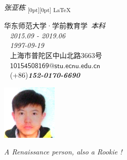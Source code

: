 \documentclass[a4paper, 12pt, oneside]{article}
\begin{document}
\newcommand\myworries[1]{\textcolor{red}{#1}}
\pagestyle{empty}
    \begin{tcolorbox}[colback=red!58!white,colframe=red!75!black]
        \Large \textit{张亚栋} \hfill\textsubscript{\raisebox{0pt}[0pt][0pt]{\large\faHeartO\raisebox{0.3ex}{\fontsize{12pt}{12pt}\faHeartO}%
    \raisebox{2.2ex}{\fontsize{11pt}{11pt}\faHeartO}%
    \raisebox{4.5ex}{\fontsize{10pt}{10pt}\faHeartO}
    \LaTeX
}}
    \end{tcolorbox}
    \begin{minipage}[t]{0.6\linewidth}
    \noindent
    \textcolor{red}{\faGraduationCap} 华东师范大学·学前教育学~\emph{本科}\\
    \textcolor{black}{\faCalendar}~ \emph{2015.09 - 2019.06}\\
    \textcolor{blue}{\faMars}~ \emph{1997-09-19}\\
    \textcolor{yellow}{\faMapMarker}~ 上海市普陀区中山北路3663号\\
    \textcolor{cyan}{\faEnvelope}~ $\mathsf{10154508169@stu.ecnu.edu.cn}$ \\ 
    \textcolor{black}{\fontsize{18pt}{18pt}\faMobile}~ (+86)\textbf{\emph{152-0170-6690}}
    \end{minipage}
    \begin{minipage}[t]{0.1\linewidth}
    \begin{center}
        \includegraphics{photo.png}
    \end{center}
    \end{minipage}
    \begin{shadequote}{}
    \par
        \emph{A Renaissance person, also a Rookie !}
    \par
    \end{shadequote}
\end{document}
